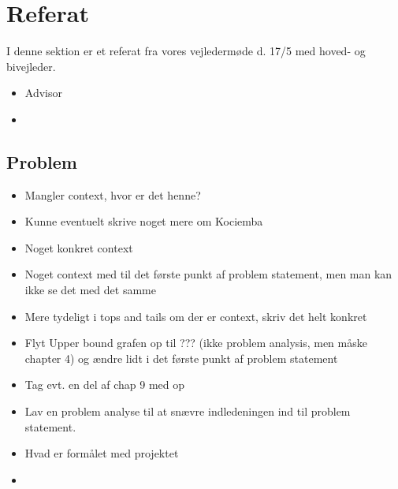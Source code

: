 \section{Referat}
I denne sektion er et referat fra vores vejlederm\o{}de d. 17/5 med hoved- og bivejleder.
\label{ref}
\begin{itemize}
	\item Advisor
	\item 
\end{itemize}

\subsection{Problem}
\begin{itemize}
	\item Mangler context, hvor er det henne?
	\item Kunne eventuelt skrive noget mere om Kociemba
	\item Noget konkret context
	\item Noget context med til det f\o{}rste punkt af problem statement, men man kan ikke se det med det samme
	\item Mere tydeligt i tops and tails om der er context, skriv det helt konkret
	\item Flyt Upper bound grafen op til ??? (ikke problem analysis, men m\aa{}ske chapter 4) og \ae{}ndre lidt i det f\o{}rste punkt af problem statement
	\item Tag evt. en del af chap 9 med op
	\item Lav en problem analyse til at sn\ae{}vre indledeningen ind til problem statement.
	\item Hvad er form\aa{}let med projektet
	\item 
\end{itemize}


